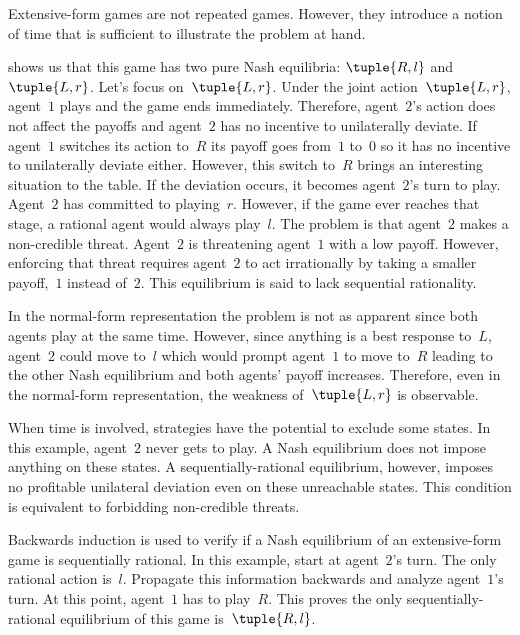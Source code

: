 \begin{example}
Extensive-form games are not repeated games.
However, they introduce a notion of time that is sufficient to illustrate the problem at hand.

 shows us that this game has two pure Nash equilibria: \(\tuple{R,l}\) and~\(\tuple{L,r}\).
Let's focus on~\(\tuple{L,r}\).
Under the joint action~\(\tuple{L,r}\), agent~\(1\) plays and the game ends immediately.
Therefore, agent~\(2\)'s action does not affect the payoffs and agent~\(2\) has no incentive to unilaterally deviate.
If agent~\(1\) switches its action to~\(R\) its payoff goes from~\(1\) to~\(0\) so it has no incentive to unilaterally deviate either.
However, this switch to~\(R\) brings an interesting situation to the table.
If the deviation occurs, it becomes agent~\(2\)'s turn to play.
Agent~\(2\) has committed to playing~\(r\).
However, if the game ever reaches that stage, a rational agent would always play~\(l\).
The problem is that agent~\(2\) makes a non-credible threat.
Agent~\(2\) is threatening agent~\(1\) with a low payoff.
However, enforcing that threat requires agent~\(2\) to act irrationally by taking a smaller payoff,~\(1\) instead of~\(2\).
This equilibrium is said to lack sequential rationality.

In the normal-form representation the problem is not as apparent since both agents play at the same time.
However, since anything is a best response to~\(L\), agent~\(2\) could move to~\(l\) which would prompt agent~\(1\) to move to~\(R\) leading to the other Nash equilibrium and both agents' payoff increases.
Therefore, even in the normal-form representation, the weakness of~\(\tuple{L,r}\) is observable.

When time is involved, strategies have the potential to exclude some states.
In this example, agent~\(2\) never gets to play.
A Nash equilibrium does not impose anything on these states.
A sequentially-rational equilibrium, however, imposes no profitable unilateral deviation even on these unreachable states.
This condition is equivalent to forbidding non-credible threats.

Backwards induction is used to verify if a Nash equilibrium of an extensive-form game is sequentially rational.
In this example, start at agent~\(2\)'s turn.
The only rational action is~\(l\).
Propagate this information backwards and analyze agent~\(1\)'s turn.
At this point, agent~\(1\) has to play~\(R\).
This proves the only sequentially-rational equilibrium of this game is~\(\tuple{R, l}\).
\end{example}

